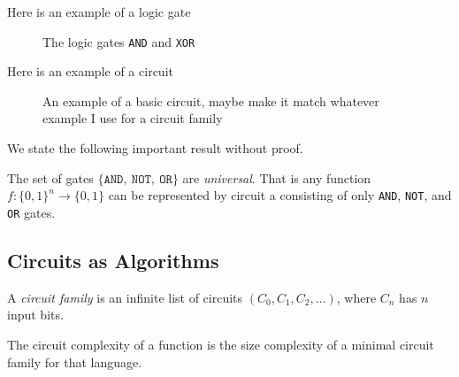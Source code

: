         \begin{example}
         Here is an example of a logic gate

         \begin{figure}[ht]
            \centering
            \placeholderfig
            \caption{ The logic gates \texttt{AND} and \texttt{XOR} }
        \end{figure}
        \end{example}

        \bigskip

        \begin{example}
            Here is an example of a circuit

            \begin{figure}[ht]
                \centering
                    \placeholderfig
                \caption{An example of a basic circuit, maybe make it match whatever example I use for a circuit 
                family}
            \end{figure}

    
        \end{example}

        We state the following important result without proof.
        \begin{theorem}
            The set of gates $\{ \texttt{AND},\ \texttt{NOT},\ \texttt{OR} \}$ are \emph{universal}. That is any 
            function $f : \{0, 1\}^n \rightarrow \{0, 1\}$ can be represented by circuit a consisting of only 
            \texttt{AND}, \texttt{NOT}, and \texttt{OR} gates.
        \end{theorem}
        
        

        \subsection{Circuits as Algorithms}
        
        \begin{definition}
                 A \emph{circuit family} is an infinite list of circuits $(C_0, C_1, C_2, ...)$, where $C_n$ has 
                 $n$ input bits.
        \end{definition}

        \begin{definition}
            The circuit complexity of a function is the size complexity of a minimal circuit family for that 
            language. 
        \end{definition}

